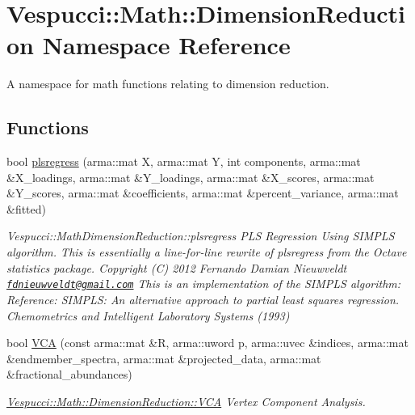 \hypertarget{namespace_vespucci_1_1_math_1_1_dimension_reduction}{\section{Vespucci\+:\+:Math\+:\+:Dimension\+Reduction Namespace Reference}
\label{namespace_vespucci_1_1_math_1_1_dimension_reduction}
}


A namespace for math functions relating to dimension reduction.  


\subsection*{Functions}
\begin{DoxyCompactItemize}
\item 
bool \hyperlink{namespace_vespucci_1_1_math_1_1_dimension_reduction_a5878e156d2d744ee078a70eeb59f97b3}{plsregress} (arma\+::mat X, arma\+::mat Y, int components, arma\+::mat \&X\+\_\+loadings, arma\+::mat \&Y\+\_\+loadings, arma\+::mat \&X\+\_\+scores, arma\+::mat \&Y\+\_\+scores, arma\+::mat \&coefficients, arma\+::mat \&percent\+\_\+variance, arma\+::mat \&fitted)
\begin{DoxyCompactList}\small\item\em Vespucci\+::\+Math\+Dimension\+Reduction\+::plsregress P\+L\+S Regression Using S\+I\+M\+P\+L\+S algorithm. This is essentially a line-\/for-\/line rewrite of plsregress from the Octave statistics package. Copyright (C) 2012 Fernando Damian Nieuwveldt \href{mailto:fdnieuwveldt@gmail.com}{\tt fdnieuwveldt@gmail.\+com} This is an implementation of the S\+I\+M\+P\+L\+S algorithm\+: Reference\+: S\+I\+M\+P\+L\+S\+: An alternative approach to partial least squares regression. Chemometrics and Intelligent Laboratory Systems (1993) \end{DoxyCompactList}\item 
bool \hyperlink{namespace_vespucci_1_1_math_1_1_dimension_reduction_a2d46d5cccce427efee376aeeea2da058}{V\+C\+A} (const arma\+::mat \&R, arma\+::uword p, arma\+::uvec \&indices, arma\+::mat \&endmember\+\_\+spectra, arma\+::mat \&projected\+\_\+data, arma\+::mat \&fractional\+\_\+abundances)
\begin{DoxyCompactList}\small\item\em \hyperlink{namespace_vespucci_1_1_math_1_1_dimension_reduction_a2d46d5cccce427efee376aeeea2da058}{Vespucci\+::\+Math\+::\+Dimension\+Reduction\+::\+V\+C\+A} Vertex Component Analysis. \end{DoxyCompactList}\item 

\end{DoxyCompactItemize}
